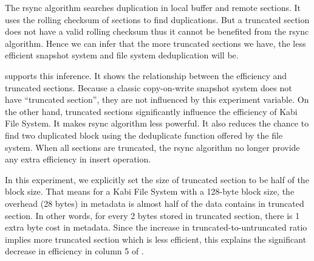     The rsync algorithm searches duplication in local buffer and remote sections. It uses the rolling checksum of sections to find duplications. But a truncated section does not have a valid rolling checksum thus it cannot be benefited from the rsync algorithm. Hence we can infer that the more truncated sections we have, the less efficient snapshot system and file system deduplication will be.

     supports this inference. It shows the relationship between the efficiency and truncated sections. Because a classic copy-on-write snapshot system does not have ``truncated section'', they are not influenced by this experiment variable. On the other hand, truncated sections significantly influence the efficiency of Kabi File System. It makes rsync algorithm less powerful. It also reduces the chance to find two duplicated block using the deduplicate function offered by the file system. When all sections are truncated, the rsync algorithm no longer provide any extra efficiency in insert operation.

    In this experiment, we explicitly set the size of truncated section to be half of the block size. That means for a Kabi File System with a 128-byte block size, the overhead (28 bytes) in metadata is almost half of the data contains in truncated section. In other words, for every 2 bytes stored in truncated section, there is 1 extra byte cost in metadata. Since the increase in truncated-to-untruncated ratio implies more truncated section which is less efficient, this explains the significant decrease in efficiency in column 5 of .

